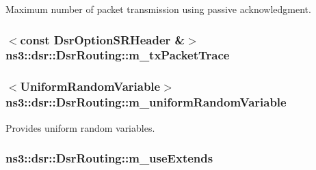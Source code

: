 Maximum number of packet transmission using passive acknowledgment. 

\subsubsection[{\texorpdfstring{m\+\_\+tx\+Packet\+Trace}{m_txPacketTrace}}]{$<$const {\bf Dsr\+Option\+S\+R\+Header} \&$>$ ns3\+::dsr\+::\+Dsr\+Routing\+::m\+\_\+tx\+Packet\+Trace\hspace{0.3cm}{\ttfamily [protected]}}\hypertarget{classns3_1_1dsr_1_1DsrRouting_a5e0a4e554d0321bd993b532d68931d75}{}\label{classns3_1_1dsr_1_1DsrRouting_a5e0a4e554d0321bd993b532d68931d75}
\subsubsection[{\texorpdfstring{m\+\_\+uniform\+Random\+Variable}{m_uniformRandomVariable}}]{$<${\bf Uniform\+Random\+Variable}$>$ ns3\+::dsr\+::\+Dsr\+Routing\+::m\+\_\+uniform\+Random\+Variable\hspace{0.3cm}{\ttfamily [private]}}\hypertarget{classns3_1_1dsr_1_1DsrRouting_a22a85b3510166ffdd451e4010f996f0f}{}\label{classns3_1_1dsr_1_1DsrRouting_a22a85b3510166ffdd451e4010f996f0f}


Provides uniform random variables. 

\subsubsection[{\texorpdfstring{m\+\_\+use\+Extends}{m_useExtends}}]{ ns3\+::dsr\+::\+Dsr\+Routing\+::m\+\_\+use\+Extends\hspace{0.3cm}{\ttfamily [private]}}\hypertarget{classns3_1_1dsr_1_1DsrRouting_aa0a73bc163b0b32c84a5913ebbb62dc5}{}\label{classns3_1_1dsr_1_1DsrRouting_aa0a73bc163b0b32c84a5913ebbb62dc5}


